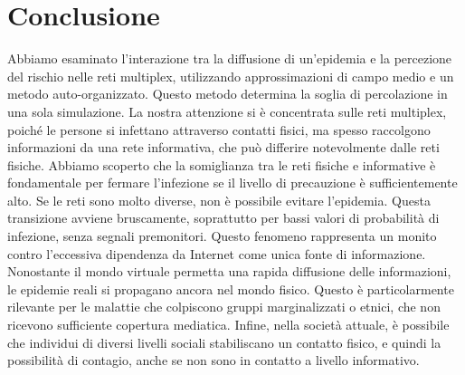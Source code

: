 \section{Conclusione}\label{sec:conclusione}
    Abbiamo esaminato l'interazione tra la diffusione di un'epidemia e la percezione del rischio nelle reti multiplex,
    utilizzando approssimazioni di campo medio e un metodo auto-organizzato.
    Questo metodo determina la soglia di percolazione in una sola simulazione.
    La nostra attenzione si è concentrata sulle reti multiplex, poiché le persone si infettano attraverso contatti
    fisici, ma spesso raccolgono informazioni da una rete informativa, che può differire notevolmente dalle reti fisiche.
    Abbiamo scoperto che la somiglianza tra le reti fisiche e informative è fondamentale per fermare l'infezione se il
    livello di precauzione è sufficientemente alto.
    Se le reti sono molto diverse, non è possibile evitare l'epidemia.
    Questa transizione avviene bruscamente, soprattutto per bassi valori di probabilità di infezione, senza segnali
    premonitori.
    Questo fenomeno rappresenta un monito contro l'eccessiva dipendenza da Internet come unica fonte di informazione.
    Nonostante il mondo virtuale permetta una rapida diffusione delle informazioni, le epidemie reali si propagano
    ancora nel mondo fisico.
    Questo è particolarmente rilevante per le malattie che colpiscono gruppi marginalizzati o etnici, che non ricevono
    sufficiente copertura mediatica.
    Infine, nella società attuale, è possibile che individui di diversi livelli sociali stabiliscano un contatto fisico,
    e quindi la possibilità di contagio, anche se non sono in contatto a livello informativo.